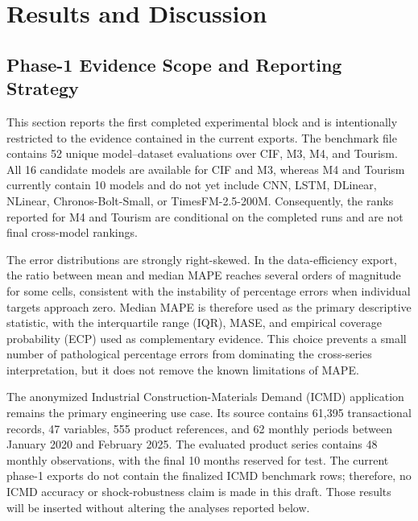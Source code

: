 ﻿%

\section{Results and Discussion}
\label{sec:results_discussion}

\subsection{Phase-1 Evidence Scope and Reporting Strategy}
\label{subsec:phase1_scope}

This section reports the first completed experimental block and is intentionally
restricted to the evidence contained in the current exports. The benchmark file
contains 52 unique model--dataset evaluations over CIF, M3, M4, and Tourism.
All 16 candidate models are available for CIF and M3, whereas M4 and Tourism
currently contain 10 models and do not yet include CNN, LSTM, DLinear, NLinear,
Chronos-Bolt-Small, or TimesFM-2.5-200M. Consequently, the ranks reported for
M4 and Tourism are conditional on the completed runs and are not final
cross-model rankings.

The error distributions are strongly right-skewed. In the data-efficiency
export, the ratio between mean and median MAPE reaches several orders of
magnitude for some cells, consistent with the instability of percentage errors
when individual targets approach zero. Median MAPE is therefore used as the
primary descriptive statistic, with the interquartile range (IQR), MASE, and
empirical coverage probability (ECP) used as complementary evidence. This
choice prevents a small number of pathological percentage errors from
dominating the cross-series interpretation, but it does not remove the known
limitations of MAPE.

The anonymized Industrial Construction-Materials Demand (ICMD) application
remains the primary engineering use case. Its source contains 61,395
transactional records, 47 variables, 555 product references, and 62 monthly
periods between January 2020 and February 2025. The evaluated product series
contains 48 monthly observations, with the final 10 months reserved for test.
The current phase-1 exports do not contain the finalized ICMD benchmark rows;
therefore, no ICMD accuracy or shock-robustness claim is made in this draft.
Those results will be inserted without altering the analyses reported below.

